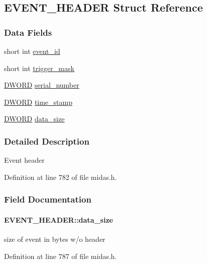 \subsection{EVENT\_\-HEADER Struct Reference}
\label{structEVENT__HEADER}
\subsubsection*{Data Fields}
\begin{DoxyCompactItemize}
\item 
short int \hyperlink{structEVENT__HEADER_a107bbb0fbe21582dc0f0e78f60b997b3}{event\_\-id}
\item 
short int \hyperlink{structEVENT__HEADER_a9b4b94f41521f5c188655b7bb0f1ec1b}{trigger\_\-mask}
\item 
\hyperlink{vt2_8h_a798af1e30bc65f319c1a246cecf59e39}{DWORD} \hyperlink{structEVENT__HEADER_a5ed07c075ebce619a8fa47e96f188440}{serial\_\-number}
\item 
\hyperlink{vt2_8h_a798af1e30bc65f319c1a246cecf59e39}{DWORD} \hyperlink{structEVENT__HEADER_a989421ee804ab76a0e11ac1c9c3b0e7a}{time\_\-stamp}
\item 
\hyperlink{vt2_8h_a798af1e30bc65f319c1a246cecf59e39}{DWORD} \hyperlink{structEVENT__HEADER_a194220c29419e01ef4cab6d3dd8daedb}{data\_\-size}
\end{DoxyCompactItemize}


\subsubsection{Detailed Description}
Event header 

Definition at line 782 of file midas.h.

\subsubsection{Field Documentation}
\paragraph[{data\_\-size}]{ {\bf EVENT\_\-HEADER::data\_\-size}}\hfill\label{structEVENT__HEADER_a194220c29419e01ef4cab6d3dd8daedb}
size of event in bytes w/o header 

Definition at line 787 of file midas.h.


